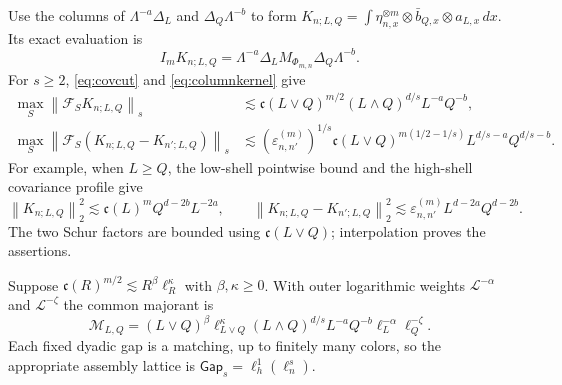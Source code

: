\documentclass[11pt,a4paper]{amsart}
\numberwithin{equation}{section}
\theoremstyle{definition}
\theoremstyle{remark}
\newcommand{\Flat}{\mathcal F}
\newcommand{\norm}[1]{\left\lVert#1\right\rVert}
\begin{document}
Use the columns of $\Lambda^{-a}\Delta_L$ and $\Delta_Q\Lambda^{-b}$ to form
$K_{n;L,Q}=\int\eta_{n,x}^{\otimes m}\otimes\bar b_{Q,x}\otimes a_{L,x}\,dx$.
Its exact evaluation is
\[
 I_mK_{n;L,Q}=\Lambda^{-a}\Delta_LM_{\Phi_{m,n}}\Delta_Q\Lambda^{-b}.
\]
For $s\ge2$, \eqref{eq:covcut} and \eqref{eq:columnkernel} give
\begin{align}
 \max_S\norm{\Flat_SK_{n;L,Q}}_s
 &\lesssim\mathfrak c(L\vee Q)^{m/2}(L\wedge Q)^{d/s}L^{-a}Q^{-b},\label{eq:geomprofile}\\
 \max_S\norm{\Flat_S(K_{n;L,Q}-K_{n';L,Q})}_s
 &\lesssim(\varepsilon_{n,n'}^{(m)})^{1/s}
 \mathfrak c(L\vee Q)^{m(1/2-1/s)}L^{d/s-a}Q^{d/s-b}.\label{eq:geomdiff}
\end{align}
For example, when $L\ge Q$, the low-shell pointwise bound and the high-shell covariance profile give
\[
 \norm{K_{n;L,Q}}_2^2\lesssim\mathfrak c(L)^mQ^{d-2b}L^{-2a},\qquad
 \norm{K_{n;L,Q}-K_{n';L,Q}}_2^2
 \lesssim\varepsilon_{n,n'}^{(m)}L^{d-2a}Q^{d-2b}.
\]
The two Schur factors are bounded using $\mathfrak c(L\vee Q)$; interpolation proves the assertions.

Suppose $\mathfrak c(R)^{m/2}\lesssim R^\beta\ell_R^\kappa$ with $\beta,\kappa\ge0$. With outer logarithmic weights $\mathscr L^{-\alpha}$ and $\mathscr L^{-\zeta}$ the common majorant is
\begin{equation}\label{eq:geometricmajorant}
 \mathcal M_{L,Q}=(L\vee Q)^\beta\ell_{L\vee Q}^{\kappa}
 (L\wedge Q)^{d/s}L^{-a}Q^{-b}\ell_L^{-\alpha}\ell_Q^{-\zeta}.
\end{equation}
Each fixed dyadic gap is a matching, up to finitely many colors, so the appropriate assembly lattice is $\mathsf{Gap}_s=\ell^1_h(\ell^s_n)$.
\end{document}
